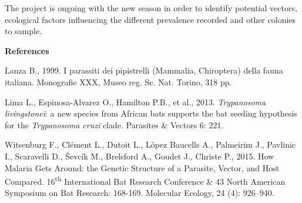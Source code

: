 {The project is ongoing with the new season in order to identify potential vectors, ecological factors influencing the different prevalence recorded and other colonies to sample.\break

\vskip3mm
\begin{footnotesize}
\textbf{References}

Lanza B., 1999. I parassiti dei pipistrelli (Mammalia, Chiroptera) della fauna italiana. Monografie XXX, Museo reg. Sc. Nat. Torino, 318 pp.\par

Lima L., Espinosa-Alvarez O., Hamilton P.B., et al., 2013. \emph{Trypanosoma livingstonei}: a new species from African bats supports the bat seeding hypothesis for the \emph{Trypanosoma cruzi} clade. Parasites \& Vectors 6: 221.\par

Witsenburg F., Clément L., Dutoit L., Lòpez Baucells A., Palmeirim J., Pavlinic I., Scaravelli D., Ševcík M., Brelsford A., Goudet J., Christe P., 2015. How Malaria Gets Around: the Genetic Structure of a Parasite, Vector, and Host Compared. 16\textsuperscript{th} International Bat Research Conference \& 43 North American Symposium on Bat Research: 168-169. Molecular Ecology, 24 (4): 926–940.\par
\end{footnotesize}
} %